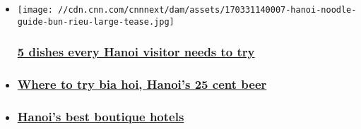 \begin{itemize}
\item
  \href{/travel/article/hanoi-food-best-dishes/index.html}{}

  \texttt{[image: //cdn.cnn.com/cnnnext/dam/assets/170331140007-hanoi-noodle-guide-bun-rieu-large-tease.jpg]}

  \hypertarget{5-dishes-every-hanoi-visitor-needs-to-try}{%
  \subsubsection{\texorpdfstring{\href{/travel/article/hanoi-food-best-dishes/index.html}{5
  dishes every Hanoi visitor needs to
  try}}{5 dishes every Hanoi visitor needs to try}}\label{5-dishes-every-hanoi-visitor-needs-to-try}}
\item
  \hypertarget{where-to-try-bia-hoi-hanois-25-cent-beer-}{%
  \subsubsection{\texorpdfstring{\href{/travel/article/hanoi-ta-hien-street/index.html}{Where
  to try bia hoi, Hanoi's 25 cent beer
  }}{Where to try bia hoi, Hanoi's 25 cent beer }}\label{where-to-try-bia-hoi-hanois-25-cent-beer-}}
\item
  \hypertarget{hanois-best-boutique-hotels}{%
  \subsubsection{\texorpdfstring{\href{/travel/article/hanoi-boutique-hotels/index.html}{Hanoi's
  best boutique
  hotels}}{Hanoi's best boutique hotels}}\label{hanois-best-boutique-hotels}}
\end{itemize}

